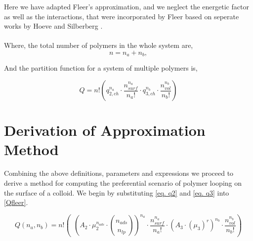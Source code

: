 \documentclass[10pt,letterpaper]{article}
\begin{document}
\noindent Here we have adapted Fleer's approximation, 
%
and we neglect the energetic factor as well as the interactions, that were incorporated by Fleer based on seperate works by Hoeve \cite{hoeve1970general}  and Silberberg \cite{silberberg1968adsorption}.\\\\

\noindent Where, the total number of polymers in the whole system are,
\begin{equation}
	n=n_a+n_b,
	\label{eq. n}
\end{equation}

\noindent And the partition function for a system of multiple polymers is,



\begin{equation}
	Q=
	n!
	\left(
		q_{2,ch}^{n_{a}}
		\cdot
		\frac{
			n_{surf}^{n_{a}}
		}{
			n_a!
		}
		\cdot
		q_{3,ch}^{n_{b}}
		\cdot
		\frac{
			n_{vol}^{n_{b}}
		}{
			n_b!
		}
	\right)
	\label{Qfleer}
\end{equation}

\newpage
\section*{Derivation of Approximation Method}

Combining the above definitions, parameters and expressions we proceed to derive a method for computing the preferential scenario of polymer looping on the surface of a colloid. We begin by substituting \ref{eq. q2} and \ref{eq. q3} into \ref{Qfleer}.

\begin{equation}
	Q(n_a,n_b)=
	n!
	\left(~~
		\left(
		A_2
		\cdot 
		\mu_{2}^{n_{ads}}
		\cdot 
		\binom{
			n_{ads}
		}{
			n_{lp}
		}
		\right)^{n_{a}} 
		\cdot
		\frac{
			n_{surf}^{n_{a}}
		}{
			n_a!
		}
		\cdot
		\left(
			A_3
			\cdot
			\left(
				\mu_{3}
			\right)^{r}
		\right)^{n_{b}}
		\cdot
		\frac{
			n_{vol}^{n_{b}}
		}{
			n_b!
		}
	\right)
	\label{Qmadras}
\end{equation}
\end{document}
